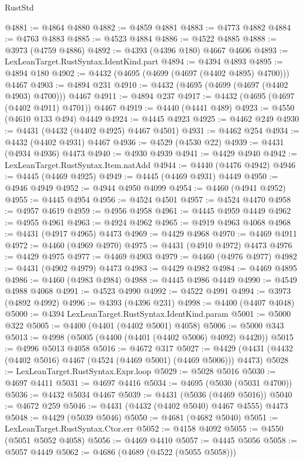 \begin{lexlean}{RustStd}
\begin{coremodule}
@4881 := @4864 @4880
@4882 := @4859 @4881
@4883 := @4773 @4882
@4884 := @4763 @4883
@4885 := @4523 @4884
@4886 := @4522 @4885
@4888 := @3973 (@4759 @4886)
@4892 := @4393 (@4396 @180) @4667 @4606
@4893 := LexLeanTarget.RustSyntax.IdentKind.part
@4894 := @4394 @4893
@4895 := @4894 @180
@4902 := @4432 (@4695 (@4699 (@4697 (@4402 @4895) @4700))) @4467
@4903 := @4894 @231
@4910 := @4432 (@4695 (@4699 (@4697 (@4402 @4903) @4700))) @4467
@4911 := @4894 @237
@4917 := @4432 (@4695 (@4697 (@4402 @4911) @4701)) @4467
@4919 := @4440 (@4441 @489)
@4923 := @4550 (@4610 @133 @494) @4449
@4924 := @4445 @4923
@4925 := @4462 @249
@4930 := @4431 (@4432 (@4402 @4925) @4467 @4501)
@4931 := @4462 @254
@4934 := @4432 (@4402 @4931) @4467
@4936 := @4529 (@4530 @22)
@4939 := @4431 (@4934 @4936) @4473
@4940 := @4930 @4939
@4941 := @4429 @4940
@4942 := LexLeanTarget.RustSyntax.Item.natAdd
@4944 := @4440 (@4476 @4942)
@4946 := @4445 (@4469 @4925)
@4949 := @4445 (@4469 @4931) @4449
@4950 := @4946 @4949
@4952 := @4944 @4950 @4099
@4954 := @4460 (@4941 @4952)
@4955 := @4445 @4954
@4956 := @4524 @4501
@4957 := @4524 @4470
@4958 := @4957 @4619
@4959 := @4956 @4958
@4961 := @4445 @4959 @4449
@4962 := @4955 @4961
@4963 := @4924 @4962
@4965 := @4919 @4963 @4068
@4968 := @4431 (@4917 @4965) @4473
@4969 := @4429 @4968
@4970 := @4469 @4911
@4972 := @4460 (@4969 @4970)
@4975 := @4431 (@4910 @4972) @4473
@4976 := @4429 @4975
@4977 := @4469 @4903
@4979 := @4460 (@4976 @4977)
@4982 := @4431 (@4902 @4979) @4473
@4983 := @4429 @4982
@4984 := @4469 @4895
@4986 := @4460 (@4983 @4984)
@4988 := @4445 @4986 @4449
@4990 := @4549 @4988 @4068
@4991 := @4523 @4990
@4992 := @4522 @4991
@4994 := @3973 (@4892 @4992)
@4996 := @4393 (@4396 @231)
@4998 := @4400 (@4407 @4048)
@5000 := @4394 LexLeanTarget.RustSyntax.IdentKind.param
@5001 := @5000 @322
@5005 := @4400 (@4401 (@4402 @5001) @4058)
@5006 := @5000 @343
@5013 := @4998 (@5005 (@4400 (@4401 (@4402 @5006) @4092) @4420))
@5015 := @4996 @5013 @4058
@5016 := @4672 @317
@5027 := @4429 (@4431 (@4432 (@4402 @5016) @4467 (@4524 (@4469 @5001) (@4469 @5006))) @4473)
@5028 := LexLeanTarget.RustSyntax.Expr.loop
@5029 := @5028 @5016
@5030 := @4697 @4411
@5031 := @4697 @4416
@5034 := @4695 (@5030 (@5031 @4700))
@5036 := @4432 @5034 @4467
@5039 := @4431 (@5036 (@4469 @5016))
@5040 := @4672 @259
@5046 := @4431 (@4432 (@4402 @5040) @4467 @4555) @4473
@5048 := @4429 (@5039 @5046)
@5050 := @4681 (@4682 @5040)
@5051 := LexLeanTarget.RustSyntax.Ctor.err
@5052 := @4158 @4092
@5055 := @4550 (@5051 @5052 @4058)
@5056 := @4469 @4410
@5057 := @4445 @5056
@5058 := @5057 @4449
@5062 := @4686 (@4689 (@4522 (@5055 @5058)))

\end{coremodule}
\end{lexlean}

